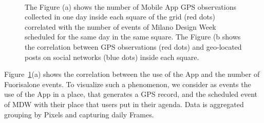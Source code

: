 \begin{figure}[p]
\centering
{} \\
\caption{The Figure (a) shows the number of Mobile App GPS observations collected in one day inside each square
of the grid (red dots) correlated with the number of events of Milano Design
Week scheduled for the same day in the same square. The Figure (b shows the correlation between GPS observations (red dots) and geo-located posts on social networks (blue dots) inside each square.}
\label{fig:gps_geo_1}
\end{figure}

Figure~\ref{fig:gps_geo_1}(a) shows the correlation between the use of the App and the number of Fuorisalone events. To visualize such a phenomenon, we consider as \textsf{event}s the use of the App in a \textsf{place}, that generates a GPS record, and the scheduled \textsf{event} of MDW with their \textsf{place} that users put in their agenda. Data is aggregated grouping by \textsf{Pixel}s and capturing daily \textsf{Frame}s.

